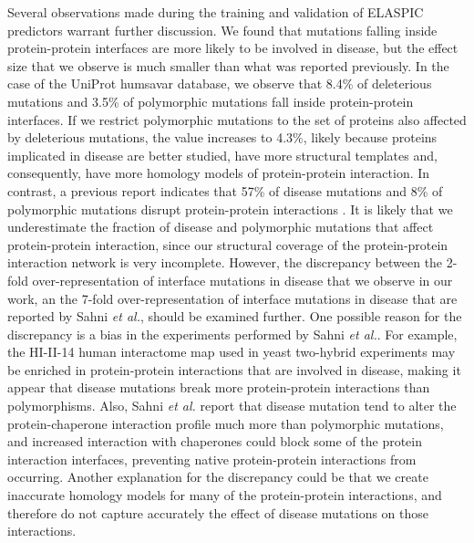 Several observations made during the training and validation of ELASPIC predictors warrant further discussion. We found that mutations falling inside protein-protein interfaces are more likely to be involved in disease, but the effect size that we observe is much smaller than what was reported previously. In the case of the UniProt humsavar database, we observe that 8.4\% of deleterious mutations and 3.5\% of polymorphic mutations fall inside protein-protein interfaces. If we restrict polymorphic mutations to the set of proteins also affected by deleterious mutations, the value increases to 4.3\%, likely because proteins implicated in disease are better studied, have more structural templates and, consequently, have more homology models of protein-protein interaction. In contrast, a previous report indicates that 57\% of disease mutations and 8\% of polymorphic mutations disrupt protein-protein interactions \cite{sahni_widespread_2015}. It is likely that we underestimate the fraction of disease and polymorphic mutations that affect protein-protein interaction, since our structural coverage of the protein-protein interaction network is very incomplete. However, the discrepancy between the 2-fold over-representation of interface mutations in disease that we observe in our work, an the 7-fold over-representation of interface mutations in disease that are reported by Sahni \textit{et al.}, should be examined further. One possible reason for the discrepancy is a bias in the experiments performed by Sahni \textit{et al.}. For example, the HI-II-14 human interactome map used in yeast two-hybrid experiments may be enriched in protein-protein interactions that are involved in disease, making it appear that disease mutations break more protein-protein interactions than polymorphisms. Also, Sahni \textit{et al.} report that disease mutation tend to alter the protein-chaperone interaction profile much more than polymorphic mutations, and increased interaction with chaperones could block some of the protein interaction interfaces, preventing native protein-protein interactions from occurring. Another explanation for the discrepancy could be that we create inaccurate homology models for many of the protein-protein interactions, and therefore do not capture accurately the effect of disease mutations on those interactions.

